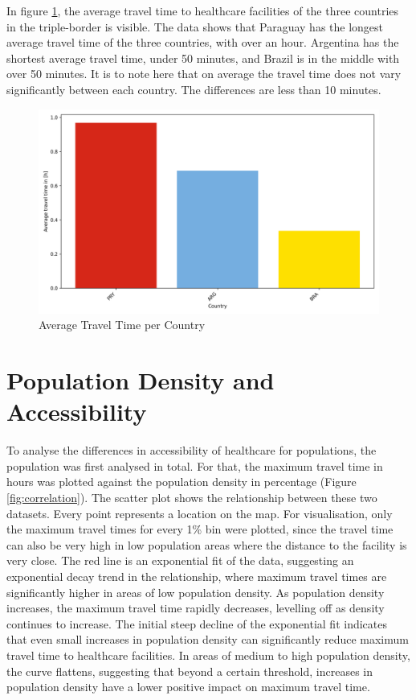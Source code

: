 \documentclass[11pt, a4paper]{report}
\begin{document}
In figure \ref{fig:traveltimecountriesplot}, the average travel time to healthcare facilities of the three countries in the triple-border is visible. The data shows that Paraguay has the longest average travel time of the three countries, with over an hour. Argentina has the shortest average travel time, under 50 minutes, and Brazil is in the middle with over 50 minutes. It is to note here that on average the travel time does not vary significantly between each country. The differences are less than 10 minutes.

\begin{figure}[H]
  \centering
  \includegraphics[width=0.9\linewidth]{figures/countries.png}
  \caption{Average Travel Time per Country}
  \label{fig:traveltimecountriesplot}
\end{figure}

\section{Population Density and Accessibility}\label{sec:results:popdens}
To analyse the differences in accessibility of healthcare for populations, the population was first analysed in total. For that, the maximum travel time in hours was plotted against the population density in percentage (Figure \ref{fig:correlation}). The scatter plot shows the relationship between these two datasets. Every point represents a location on the map. For visualisation, only the maximum travel times for every 1\% bin were plotted, since the travel time can also be very high in low population areas where the distance to the facility is very close. The red line is an exponential fit of the data, suggesting an exponential decay trend in the relationship, where maximum travel times are significantly higher in areas of low population density. As population density increases, the maximum travel time rapidly decreases, levelling off as density continues to increase. The initial steep decline of the exponential fit indicates that even small increases in population density can significantly reduce maximum travel time to healthcare facilities. In areas of medium to high population density, the curve flattens, suggesting that beyond a certain threshold, increases in population density have a lower positive impact on maximum travel time.
\end{document}
